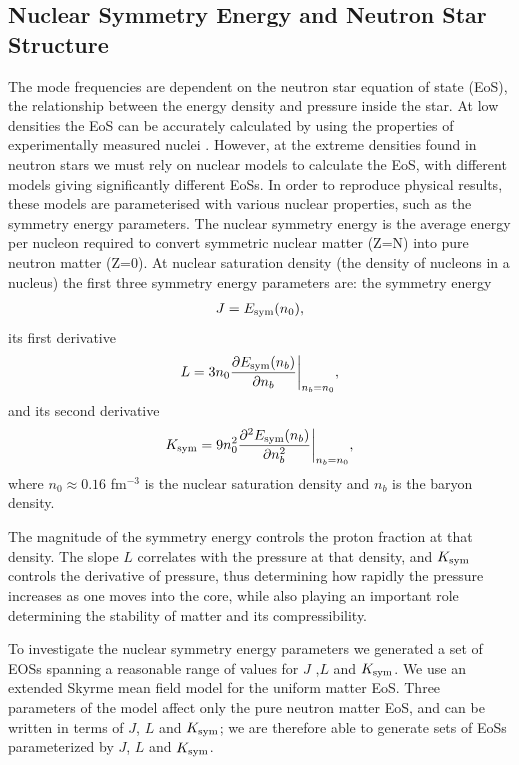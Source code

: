 \documentclass[fleqn,usenatbib]{mnras}
\begin{document}
\subsection{Nuclear Symmetry Energy and Neutron Star Structure}
\hspace{\parindent}The mode frequencies are dependent on the neutron star equation of state (EoS), the relationship between the energy density and pressure inside the star. At low densities the EoS can be accurately calculated by using the properties of experimentally measured nuclei \citet{baym1971ground}. However, at the extreme densities found in neutron stars we must rely on nuclear models to calculate the EoS, with different models giving significantly different EoSs. In order to reproduce physical results, these models are parameterised with various nuclear properties, such as the symmetry energy parameters. The nuclear symmetry energy is the average energy per nucleon required to convert symmetric nuclear matter (Z=N) into pure neutron matter (Z=0). At nuclear saturation density (the density of nucleons in a nucleus) the first three symmetry energy parameters are: the symmetry energy
\begin{align}
J=E_{\rm sym}(n_0),    
\label{eq:sym_J}
\end{align}
\noindent its first derivative 
\begin{align}
L=3n_0\frac{\partial E_{\rm sym}(n_b)}{\partial n_b}\biggr\rvert_{n_b=n_0},  
\label{eq:sym_L}
\end{align}
\noindent and its second derivative
\begin{align}
K_{\rm sym}=9n_0^2\frac{\partial^2 E_{\rm sym}(n_b)}{\partial n_b^2}\biggr\rvert_{n_b=n_0},
\label{eq:sym_K}
\end{align}
\noindent where $n_0\approx 0.16$ fm$^{-3}$ is the nuclear saturation density and $n_b$ is the baryon density.

\noindent The magnitude of the symmetry energy controls the proton fraction at that density. The slope $L$ correlates with the pressure at that density, and $K_{\rm sym}$ controls the derivative of pressure, thus determining how rapidly the pressure increases as one moves into the core, while also playing an important role determining the stability of matter and its compressibility.

\hspace{\parindent}To investigate the nuclear symmetry energy parameters we generated a set of EOSs spanning a reasonable range of values for $J$ ,$L$ and $K_{\rm sym}$. We use an extended Skyrme mean field model for the uniform matter EoS. Three parameters of the model affect only the pure neutron matter EoS, and can be written in terms of $J$, $L$ and $K_{\rm sym}$; we are therefore able to generate sets of EoSs parameterized by $J$, $L$ and $K_{\rm sym}$.
\end{document}

